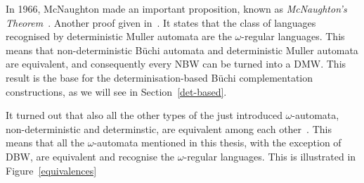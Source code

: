 \documentclass{scrreprt}
\newcommand{\om}{{$\omega$}}
\begin{document}
In 1966, McNaughton made an important proposition, known as \emph{McNaughton's Theorem}~\cite{McNaughton1966}. Another proof given in~\cite{Thomas:1991}. It states that the class of languages recognised by deterministic Muller automata are the \om-regular languages. This means that non-deterministic Büchi automata and deterministic Muller automata are equivalent, and consequently every NBW can be turned into a DMW. This result is the base for the determinisation-based Büchi complementation constructions, as we will see in Section~\ref{det-based}.

It turned out that also all the other types of the just introduced \om-automata, non-deterministic and determinstic, are equivalent among each other~\cite{2002_roggenbach}\cite{2006_klein}\cite{klein2005linear}\cite{1999_loeding}\cite{Thomas:1991}. This means that all the \om-automata mentioned in this thesis, with the exception of DBW, are equivalent and recognise the \om-regular languages. This is illustrated in Figure~\ref{equivalences}





\end{document}
